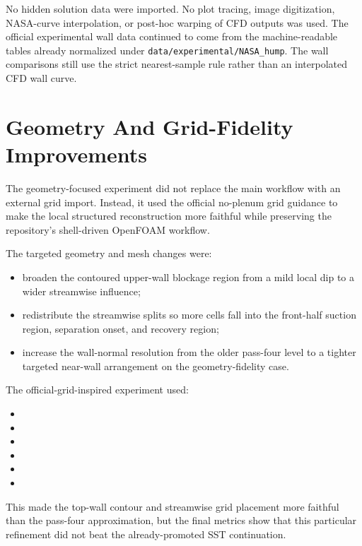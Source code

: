 \documentclass[11pt]{article}
\begin{document}
No hidden solution data were imported. No plot tracing, image digitization, NASA-curve interpolation, or post-hoc warping of CFD outputs was used. The official experimental wall data continued to come from the machine-readable tables already normalized under \texttt{data/experimental/NASA\_hump}. The wall comparisons still use the strict nearest-sample rule rather than an interpolated CFD wall curve.

\section{Geometry And Grid-Fidelity Improvements}
The geometry-focused experiment did not replace the main workflow with an external grid import. Instead, it used the official no-plenum grid guidance to make the local structured reconstruction more faithful while preserving the repository's shell-driven OpenFOAM workflow.

The targeted geometry and mesh changes were:
\begin{itemize}
\item broaden the contoured upper-wall blockage region from a mild local dip to a wider streamwise influence;
\item redistribute the streamwise splits so more cells fall into the front-half suction region, separation onset, and recovery region;
\item increase the wall-normal resolution from the older pass-four level to a tighter targeted near-wall arrangement on the geometry-fidelity case.
\end{itemize}

The official-grid-inspired experiment used:
\begin{itemize}
\item {}
\item {}
\item {}
\item {}
\item {}
\item {}
\end{itemize}

This made the top-wall contour and streamwise grid placement more faithful than the pass-four approximation, but the final metrics show that this particular refinement did not beat the already-promoted SST continuation.
\end{document}
